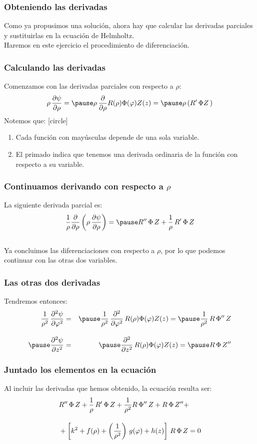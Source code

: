 \documentclass[12pt]{beamer}
\begin{document}
\begin{frame}
\frametitle{Obteniendo las derivadas}
Como ya propusimos una solución, ahora hay que calcular las derivadas parciales y sustituirlas en la ecuación de Helmholtz.
\\
\bigskip
\pause
Haremos en este ejercicio el procedimiento de diferenciación.
\end{frame}
\begin{frame}
\frametitle{Calculando las derivadas}
Comenzamos con las derivadas parciales con respecto a $\rho$:
\pause
\begin{eqnarray*}
\rho \, \pdv{\psi}{\rho} = \pause \rho \, \pdv{\rho} R(\rho) \Phi (\varphi) Z(z) = \pause \rho \left( \ptilde{R} \, \Phi Z \, \right)
\end{eqnarray*}
\pause
Notemos que:
[circle]
\begin{enumerate}[<+->]
\item Cada función con mayúsculas depende de una sola variable.
\item El primado indica que tenemos una derivada ordinaria de la función con respecto a su variable.
\end{enumerate}
\end{frame}
\begin{frame}
\frametitle{Continuamos derivando con respecto a $\rho$}
La siguiente derivada parcial es:
\begin{align*}
\dfrac{1}{\rho} \pdv{\rho} \left( \rho \, \pdv{\psi}{\rho}  \right) = \pause \stilde{R} \, \Phi \, Z + \dfrac{1}{\rho} \, \ptilde{R} \, \Phi \, Z
\end{align*}
\\
\bigskip
\pause
Ya concluimos las diferenciaciones con respecto a $\rho$, por lo que podemos continuar con las otras dos variables.
\end{frame}
\begin{frame}
\frametitle{Las otras dos derivadas}
Tendremos entonces:
\begin{eqnarray*}
\dfrac{1}{\rho^{2}} \, \pdv[2]{\psi}{\varphi} &=& \pause \dfrac{1}{\rho^{2}} \, \pdv[2]{\varphi} \, R(\rho) \Phi (\varphi) Z(z) = \pause \dfrac{1}{\rho^{2}} \, R \, \stilde{\Phi} \, Z \\[1em] \pause
\pdv[2]{\psi}{z} &=& \pause \pdv[2]{z} \, R(\rho) \Phi (\varphi) Z(z) = \pause R \, \Phi \, \stilde{Z}
\end{eqnarray*}
\end{frame}
\begin{frame}
\frametitle{Juntado los elementos en la ecuación}
Al incluir las derivadas que hemos obtenido, la ecuación resulta ser:
\begin{align*}
&{} {R}^{\prime \prime} \, \Phi \, Z + \dfrac{1}{\rho} \, {R}^{\prime} \, \Phi \, Z + \dfrac{1}{\rho^{2}} R \, {\Phi}^{\prime \prime} \, Z + R \, \Phi \, {Z}^{\prime \prime} + \\[1em]
&+ \left[ k^{2} + f(\rho) + \left( \dfrac{1}{\rho^{2}} \right) \, g(\varphi) + h(z) \right] \, R \, \Phi \, Z = 0
\end{align*}
\end{frame}
\end{document}
